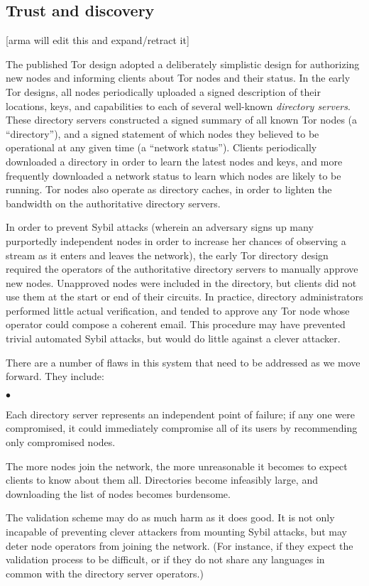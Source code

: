 \documentclass{llncs}
\newenvironment{tightlist}{\begin{list}{$\bullet$}{
  \setlength{\itemsep}{0mm}
    \setlength{\parsep}{0mm}
    }}{\end{list}}
\begin{document}
\subsection{Trust and discovery}
\label{subsec:trust-and-discovery}

[arma will edit this and expand/retract it]

The published Tor design adopted a deliberately simplistic design for
authorizing new nodes and informing clients about Tor nodes and their status.
In the early Tor designs, all nodes periodically uploaded a signed description
of their locations, keys, and capabilities to each of several well-known {\it
  directory servers}.  These directory servers constructed a signed summary
of all known Tor nodes (a ``directory''), and a signed statement of which
nodes they
believed to be operational at any given time (a ``network status'').  Clients
periodically downloaded a directory in order to learn the latest nodes and
keys, and more frequently downloaded a network status to learn which nodes are
likely to be running.  Tor nodes also operate as directory caches, in order to
lighten the bandwidth on the authoritative directory servers.

In order to prevent Sybil attacks (wherein an adversary signs up many
purportedly independent nodes in order to increase her chances of observing
a stream as it enters and leaves the network), the early Tor directory design
required the operators of the authoritative directory servers to manually
approve new nodes.  Unapproved nodes were included in the directory,
but clients
did not use them at the start or end of their circuits.  In practice,
directory administrators performed little actual verification, and tended to
approve any Tor node whose operator could compose a coherent email.
This procedure
may have prevented trivial automated Sybil attacks, but would do little
against a clever attacker.

There are a number of flaws in this system that need to be addressed as we
move forward.  They include:
\begin{tightlist}
\item Each directory server represents an independent point of failure; if
  any one were compromised, it could immediately compromise all of its users
  by recommending only compromised nodes.
\item The more nodes join the network, the more unreasonable it
  becomes to expect clients to know about them all.  Directories
  become infeasibly large, and downloading the list of nodes becomes
  burdensome.
\item The validation scheme may do as much harm as it does good.  It is not
  only incapable of preventing clever attackers from mounting Sybil attacks,
  but may deter node operators from joining the network.  (For instance, if
  they expect the validation process to be difficult, or if they do not share
  any languages in common with the directory server operators.)
\end{tightlist}
\end{document}
